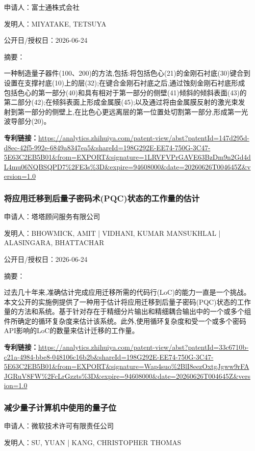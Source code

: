 \documentclass[12pt,a4paper]{ctexart}
\begin{document}
申请人：富士通株式会社

发明人：MIYATAKE, TETSUYA

公开日/授权日：2026-06-24

摘要：

一种制造量子器件(100、200)的方法,包括:将包括色心(21)的金刚石衬底(30)键合到设置在支撑衬底(10)上的层(32);在键合金刚石衬底之后,通过蚀刻金刚石衬底形成包括色心的第一部分(40)和具有相对于第一部分的侧壁(41)倾斜的倾斜表面(43)的第二部分(42);在倾斜表面上形成金属膜(45);以及通过将由金属膜反射的激光束发射到第一部分的侧壁上,在比色心更远离层的第一位置处切割第一部分,形成第一光波导部分(20)。

\noindent\textbf{专利链接：}\url{https://analytics.zhihuiya.com/patent-view/abst?patentId=147d295d-d8ec-42f5-992e-6849a8347ea5&shareId=198G292E-EE74-750G-3C47-5E63C2EB5B01&from=EXPORT&signature=1LRVFVPrGAVE63BzDm9n2Gd4dL4mu06NQBSQPD7%2FE3s%3D&expire=94608000&date=20260626T004645Z&version=1.0}

\subsubsection{ 将应用迁移到后量子密码术(PQC)状态的工作量的估计 }

申请人：塔塔顾问服务有限公司

发明人：BHOWMICK, AMIT | VIDHANI, KUMAR MANSUKHLAL | ALASINGARA, BHATTACHAR

公开日/授权日：2026-06-24

摘要：

过去几十年来,准确估计完成应用迁移所需的代码行(LoC)的能力一直是一个挑战。本文公开的实施例提供了一种用于估计将应用迁移到后量子密码(PQC)状态的工作量的方法和系统。基于针对存在于精细分片输出和精细耦合输出中的一个或多个组件所确定的循环复杂度来估计该系统。此外,使用循环复杂度和受一个或多个密码API影响的LoC的数量来估计迁移的工作量。

\noindent\textbf{专利链接：}\url{https://analytics.zhihuiya.com/patent-view/abst?patentId=33c6710b-c21a-4984-bbe8-048106c16b2b&shareId=198G292E-EE74-750G-3C47-5E63C2EB5B01&from=EXPORT&signature=Wap4suo%2BlI8eezOxtgJgww9rFAJGRuV8FW%2FcLrGzzts%3D&expire=94608000&date=20260626T004645Z&version=1.0}

\subsubsection{ 减少量子计算机中使用的量子位 }

申请人：微软技术许可有限责任公司

发明人：SU, YUAN | KANG, CHRISTOPHER THOMAS
\end{document}
